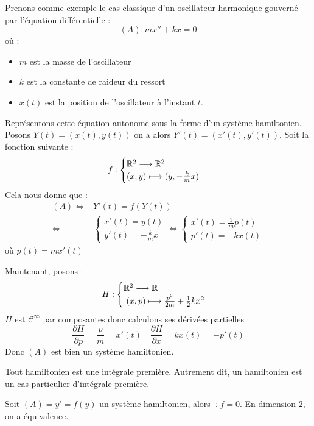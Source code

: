 \begin{example}
    Prenons comme exemple le cas classique d'un oscillateur harmonique gouverné par l'équation 
    différentielle : 
        \[ (A) : m x'' + kx = 0 \] 
    où : 
    \begin{itemize}
        \item $m$ est la masse de l'oscillateur 
        \item $k$ est la constante de raideur du ressort 
        \item $x(t)$ est la position de l'oscillateur à l'instant $t$. 
    \end{itemize}
    Représentons cette équation autonome sous la forme d'un système hamiltonien. 
    Posons $Y(t) = (x(t), y(t))$ on a alors $Y'(t) = (x'(t), y'(t))$. Soit la fonction suivante : 
    \[ f : 
        \begin{cases}
            \mathbb{R}^2 \longrightarrow \mathbb{R}^2 \\ 
            (x,y) \longmapsto (y, - \frac{k}{m}x)
        \end{cases} \] 
    Cela nous donne que : 
        \begin{align*}
            (A) \iff & Y'(t) = f(Y(t)) \\ 
            \iff & 
                \begin{cases}
                    x'(t) = y(t) \\ 
                    y'(t) = - \frac{k}{m} x 
                \end{cases} 
            \iff  
                \begin{cases}
                    x'(t) = \frac{1}{m} p(t) \\ 
                    p'(t) = -kx(t) 
                \end{cases}
        \end{align*}
        où $ p(t) = m x'(t)$ 
    
    Maintenant, posons : 
        \[ H : 
            \begin{cases}
                \R^2 \longrightarrow \R \\ 
                (x,p) \longmapsto \frac{p^2}{2m} + \frac{1}{2} k x^2 
            \end{cases} \] 
    $H$ est $ \mathcal{C}^\infty$ par composantes donc calculons ses dérivées partielles : 
        \[ \frac{\partial H}{\partial p} = \frac{p}{m} = x'(t) \quad \frac{\partial H}{\partial x} = k x(t) = - p'(t) \] 
    Donc $(A)$ est bien un système hamiltonien. 
\end{example}

\begin{prop}
    Tout hamiltonien est une intégrale première. Autrement dit, un hamiltonien est un cas particulier d'intégrale première. 
\end{prop}

\begin{proposition}
    Soit $(A) = y' = f(y)$ un système hamiltonien, alors $ \div f = 0 $. 
    En dimension 2, on a équivalence. 
\end{proposition}
